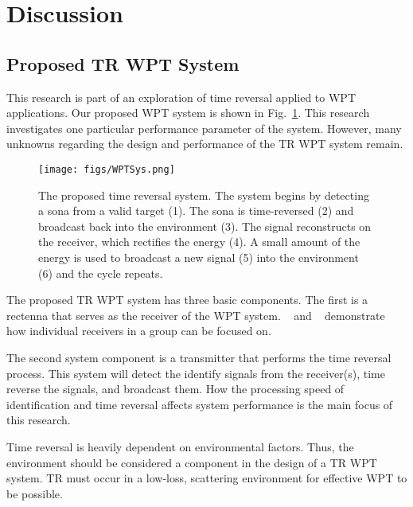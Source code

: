 \section{Discussion}

\subsection{Proposed TR WPT System}
\label{sec:WPTSys}

This research is part of an exploration of time reversal applied to WPT applications. Our proposed WPT system is shown in Fig.~\ref{fig:SysImage}. This research investigates one particular performance parameter of the system. However, many unknowns regarding the design and performance of the TR WPT system remain.

\begin{figure}[t!]
\texttt{[image: figs/WPTSys.png]}
\caption{The proposed time reversal system. The system begins by detecting a sona from a valid target (1). The sona is time-reversed (2) and broadcast back into the environment (3). The signal reconstructs on the receiver, which rectifies the energy (4).  A small amount of the energy is used to broadcast a new signal (5) into the environment (6) and the cycle repeats.}
\label{fig:SysImage}
\end{figure}


The proposed TR WPT system has three basic components. The first is a rectenna that serves as the receiver of the WPT system. ~\cite{FRAZIER} and ~\cite{ROMAN}  demonstrate how individual receivers in a group can be focused on.

The second system component is a transmitter that performs the time reversal process.  This system will detect the identify signals from the receiver(s), time reverse the signals, and broadcast them.   How the processing speed of identification and time reversal affects system performance is the main focus of this research.

Time reversal is heavily dependent on environmental factors.  Thus, the environment should be considered a component in the design of a TR WPT system.  TR must occur in a low-loss, scattering environment for effective WPT to be possible.

